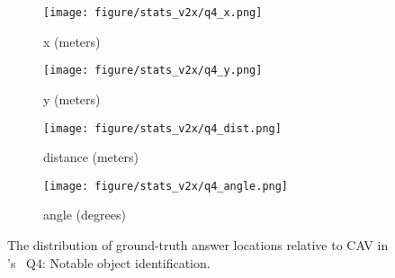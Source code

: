 \begin{figure}[!t]
        \centering
        \begin{subfigure}[t]{0.23\textwidth}
            \centering 
            \texttt{[image: figure/stats\_v2x/q4\_x.png]}
            \vspace{-20pt}
            \caption[]%
            {{x (meters)}}    
        \end{subfigure}
        \hfill
        \begin{subfigure}[t]{0.23\textwidth}  
            \centering 
            \texttt{[image: figure/stats\_v2x/q4\_y.png]}
            \vspace{-20pt}
            \caption[]%
            {{y (meters)}}
        \end{subfigure}

        \begin{subfigure}[t]{0.23\textwidth}
            \centering 
            \texttt{[image: figure/stats\_v2x/q4\_dist.png]}
            \vspace{-20pt}
            \caption[]%
            {{distance (meters)}}
        \end{subfigure}
        \hfill
        \begin{subfigure}[t]{0.23\textwidth}
            \centering 
            \texttt{[image: figure/stats\_v2x/q4\_angle.png]}
            \vspace{-20pt}
            \caption[]%
            {{angle (degrees)}}
        \end{subfigure}
        \hfill
        
        \vspace{-10pt}
        \caption[]
        {
        The distribution of ground-truth answer locations relative to CAV in \namedataset's \namexsplit~Q4: Notable object identification. 
        } 
        \label{fig:stats_v2x_q4}
        \vspace{-10pt}
\end{figure}

